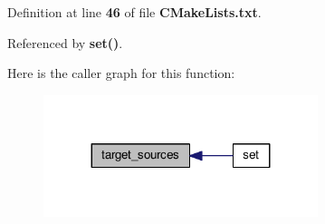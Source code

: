 Definition at line {\bf 46} of file {\bf C\+Make\+Lists.\+txt}.



Referenced by {\bf set()}.



Here is the caller graph for this function\+:
\nopagebreak
\begin{figure}[H]
\begin{center}
\leavevmode
\includegraphics[width=227pt]{da/d24/src_2ConnectionFX3_2CMakeLists_8txt_a7af24d39c1c6029c72d2cfe62e024113_icgraph}
\end{center}
\end{figure}



